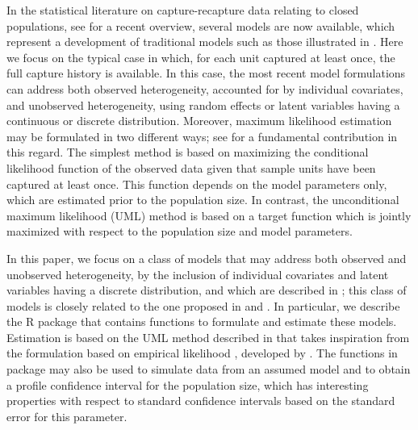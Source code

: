 In the statistical literature on capture-recapture data relating to closed populations, see \cite{BohningBook} for a recent overview, several models are now available, which represent a development of traditional models such as those illustrated in \cite{otis1978statistical}.
Here we focus on the typical case in which, for each unit captured at least once, the full capture history is available.
In this case, the most recent model formulations can address both observed heterogeneity, accounted for by individual covariates, and unobserved heterogeneity, using random effects or latent variables having a continuous or discrete distribution.
Moreover, maximum likelihood estimation may be formulated in two different ways; see \cite{Sanathanan} for a fundamental contribution in this regard.
The simplest method is based on maximizing the conditional likelihood function of the observed data given that sample units have been captured at least once.
This function depends on the model parameters only, which are estimated prior to the population size.
In contrast, the unconditional maximum likelihood (UML) method is based on a target function which is jointly maximized with respect to the population size and model parameters.

In this paper, we focus on a class of models that may address both observed and unobserved heterogeneity, by the inclusion of individual covariates and latent variables having a discrete distribution, and which are described in \cite{bartolucci2024estimating}; this class of models is closely related to the one proposed in \cite{Bart2006} and \cite{bartolucci2007class}.
In particular, we describe the R package  \citep{bart:pkg:2021} that contains functions to formulate and estimate these models.
Estimation is based on the UML method described in \cite{bartolucci2024estimating} that takes inspiration from the formulation based on empirical likelihood \citep{owen2001empirical}, developed by \cite{Liu2017}.
The functions in package  may also be used to simulate data from an assumed model and to obtain a profile confidence interval for the population size, which has interesting properties with respect to standard confidence intervals based on the standard error for this parameter.


